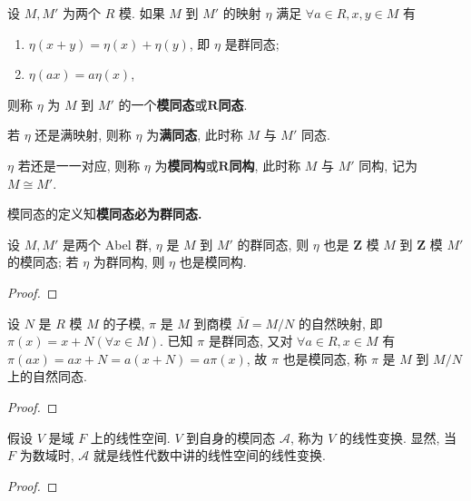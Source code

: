 \documentclass[../../main.tex]{subfiles}
\begin{document}
\begin{definition}
设 \( M, M' \) 为两个 \( R \) 模. 如果 \( M \) 到 \( M' \) 的映射 \( \eta \) 满足 \( \forall a \in R, x, y \in M \) 有
\begin{enumerate}[(1)]
\item \( \eta(x + y) = \eta(x) + \eta(y) \), 即 \( \eta \) 是群同态;
\item \( \eta(ax) = a\eta(x) \),
\end{enumerate}
则称 \( \eta \) 为 \( M \) 到 \( M' \) 的一个\textbf{模同态}或\(\boldsymbol{R}\)\textbf{同态}.

若 \( \eta \) 还是满映射, 则称 \( \eta \) 为\textbf{满同态}, 此时称 \( M \) 与 \( M' \) 同态.

\( \eta \) 若还是一一对应, 则称 \( \eta \) 为\textbf{模同构}或\(\boldsymbol{R}\)\textbf{同构}, 此时称 \( M \) 与 \( M' \) 同构, 记为 \( M \cong M' \).
\end{definition}
\begin{remark}
模同态的定义知\textbf{模同态必为群同态.}
\end{remark}

\begin{example}\label{example:抽象代数-例题1.6.10}
设 \( M, M' \) 是两个 Abel 群, \( \eta \) 是 \( M \) 到 \( M' \) 的群同态, 则 \( \eta \) 也是 \( \mathbf{Z} \) 模 \( M \) 到 \( \mathbf{Z} \) 模 \( M' \) 的模同态; 若 \( \eta \) 为群同构, 则 \( \eta \) 也是模同构.
\end{example}
\begin{proof}

\end{proof}

\begin{example}
设 \( N \) 是 \( R \) 模 \( M \) 的子模, \( \pi \) 是 \( M \) 到商模 \( \overline{M} = M/N \) 的自然映射, 即 \( \pi(x) = x + N (\forall x \in M) \). 已知 \( \pi \) 是群同态, 又对 \( \forall a \in R, x \in M \) 有 \( \pi(ax) = ax + N = a(x + N) = a\pi(x) \), 故 \( \pi \) 也是模同态, 称 \( \pi \) 是 \( M \) 到 \( M/N \) 上的自然同态.
\end{example}
\begin{proof}

\end{proof}

\begin{example}
假设 \( V \) 是域 \( F \) 上的线性空间. \( V \) 到自身的模同态 \( \mathcal{A} \), 称为 \( V \) 的线性变换. 显然, 当 \( F \) 为数域时, \( \mathcal{A} \) 就是线性代数中讲的线性空间的线性变换.
\end{example}
\begin{proof}

\end{proof}
\end{document}

